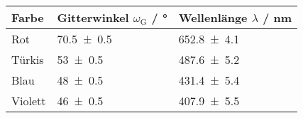 \begin{tabular}{lll}
	\toprule
	Farbe & Gitterwinkel $\omega_\text{G}$ / \si{\degree} & Wellenlänge $\lambda$ / \si{\nano\metre} \\
	\midrule
	Rot		& \num{70.5+-0.5} 	& \num{652.8+-4.1}\\
	Türkis	& \num{53+-0.5}		& \num{487.6+-5.2}\\
	Blau 	& \num{48+-0.5}		& \num{431.4+-5.4}\\
	Violett & \num{46+-0.5}		& \num{407.9+-5.5}\\
	\bottomrule
\end{tabular}
